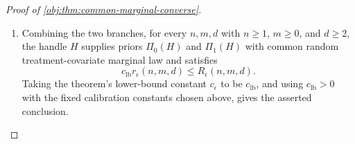 \begin{proof}[Proof of \cref{obj:thm:common-marginal-converse}]
\begin{enumerate}
\item Combining the two branches, for every \(n,m,d\) with \(n\ge1\), \(m\ge0\), and \(d\ge2\), the handle \(H\) supplies priors \(\Pi_0(H)\) and \(\Pi_1(H)\) with common random treatment-covariate marginal law and satisfies
\[
c_{\mathrm{lb}} r_\epsilon(n,m,d)\le R_\epsilon(n,m,d).
\]
Taking the theorem's lower-bound constant \(c_\epsilon\) to be \(c_{\mathrm{lb}}\), and using \(c_{\mathrm{lb}}>0\) with the fixed calibration constants chosen above, gives the asserted conclusion. %
\end{enumerate}
\end{proof}
